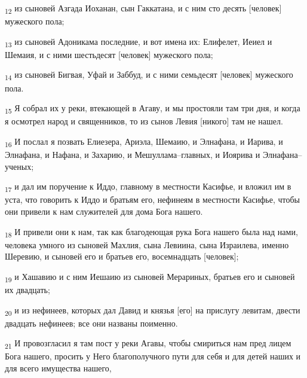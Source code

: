 \begin{tcolorbox}
\textsubscript{12} из сыновей Азгада Иоханан, сын Гаккатана, и с ним сто десять [человек] мужеского пола;
\end{tcolorbox}
\begin{tcolorbox}
\textsubscript{13} из сыновей Адоникама последние, и вот имена их: Елифелет, Иеиел и Шемаия, и с ними шестьдесят [человек] мужеского пола;
\end{tcolorbox}
\begin{tcolorbox}
\textsubscript{14} из сыновей Бигвая, Уфай и Заббуд, и с ними семьдесят [человек] мужеского пола.
\end{tcolorbox}
\begin{tcolorbox}
\textsubscript{15} Я собрал их у реки, втекающей в Агаву, и мы простояли там три дня, и когда я осмотрел народ и священников, то из сынов Левия [никого] там не нашел.
\end{tcolorbox}
\begin{tcolorbox}
\textsubscript{16} И послал я позвать Елиезера, Ариэла, Шемаию, и Элнафана, и Иарива, и Элнафана, и Нафана, и Захарию, и Мешуллама--главных, и Иоярива и Элнафана--ученых;
\end{tcolorbox}
\begin{tcolorbox}
\textsubscript{17} и дал им поручение к Иддо, главному в местности Касифье, и вложил им в уста, что говорить к Иддо и братьям его, нефинеям в местности Касифье, чтобы они привели к нам служителей для дома Бога нашего.
\end{tcolorbox}
\begin{tcolorbox}
\textsubscript{18} И привели они к нам, так как благодеющая рука Бога нашего была над нами, человека умного из сыновей Махлия, сына Левиина, сына Израилева, именно Шеревию, и сыновей его и братьев его, восемнадцать [человек];
\end{tcolorbox}
\begin{tcolorbox}
\textsubscript{19} и Хашавию и с ним Иешаию из сыновей Мерариных, братьев его и сыновей их двадцать;
\end{tcolorbox}
\begin{tcolorbox}
\textsubscript{20} и из нефинеев, которых дал Давид и князья [его] на прислугу левитам, двести двадцать нефинеев; все они названы поименно.
\end{tcolorbox}
\begin{tcolorbox}
\textsubscript{21} И провозгласил я там пост у реки Агавы, чтобы смириться нам пред лицем Бога нашего, просить у Него благополучного пути для себя и для детей наших и для всего имущества нашего,
\end{tcolorbox}

